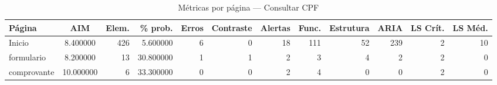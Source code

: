 \begin{table}[htbp]
  \centering
  \caption{Métricas por página — Consultar CPF}
  \label{tab:flow_consultar_cpf}
  \small
  \begin{tabular}{lcrrrrrrrrrr}
\toprule
Página & AIM & Elem. & \% prob. & Erros & Contraste & Alertas & Func. & Estrutura & ARIA & LS Crít. & LS Méd. \\
\midrule
Inicio & 8.400000 & 426 & 5.600000 & 6 & 0 & 18 & 111 & 52 & 239 & 2 & 10 \\
formulario & 8.200000 & 13 & 30.800000 & 1 & 1 & 2 & 3 & 4 & 2 & 2 & 0 \\
comprovante & 10.000000 & 6 & 33.300000 & 0 & 0 & 2 & 4 & 0 & 0 & 2 & 0 \\
\bottomrule
\end{tabular}
\end{table}
